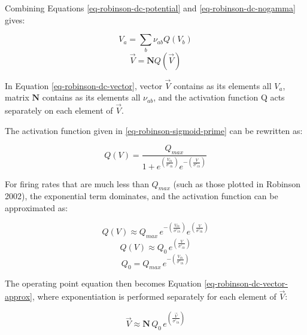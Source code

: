 Combining Equations \ref{eq-robinson-dc-potential} and
\ref{eq-robinson-dc-nogamma} gives:

\begin{equation}
V_a = \sum_b \nu_{ab} Q(V_b)
\label{eq-robinson-dc-scalar}
\end{equation}
%
\begin{equation}
\vec{V} = \mathbf{N} Q(\vec{V})
\label{eq-robinson-dc-vector}
\end{equation}

In Equation \ref{eq-robinson-dc-vector}, vector $\vec{V}$ contains as its
elements all $V_a$, matrix $\mathbf{N}$ contains as its elements all
$\nu_{ab}$, and the activation function Q acts separately on each element
of $\vec{V}$.

The activation function given in \ref{eq-robinson-sigmoid-prime} can be
rewritten as:

\begin{equation}
Q(V) = \frac{Q_{max}}{1 +
e^{\left ( \frac{V_{th}}{\sigma'_{th}} \right )}
e^{- \left ( \frac{V}{\sigma'_{th}} \right )}
}
\label{eq-robinson-sigmoid-shuffle-1}
\end{equation}

For firing rates that are much less than $Q_{max}$ (such as those plotted
in Robinson 2002), the exponential term dominates, and the activation
function can be approximated as:

\begin{equation}
Q(V) \approx Q_{max} \, e^{- \left ( \frac{V_{th}}{\sigma'_{th}} \right )}
e^{\left ( \frac{V}{\sigma'_{th}} \right )}
\label{eq-robinson-sigmoid-approx-full}
\end{equation}
%
\begin{equation}
Q(V) \approx Q_0 \, e^{\left ( \frac{V}{\sigma'_{th}} \right )}
\label{eq-robinson-sigmoid-approx}
\end{equation}
%
\begin{equation}
Q_0 = Q_{max} \, e^{- \left ( \frac{V_{th}}{\sigma'_{th}} \right )}
\label{eq-robinson-sigmoid-q0}
\end{equation}

The operating point equation then becomes Equation
\ref{eq-robinson-dc-vector-approx}, where exponentiation is performed
separately for each element of $\vec{V}$:

\begin{equation}
\vec{V} \approx
\mathbf{N} \, Q_0 \, e^{\left ( \frac{\vec{V}}{\sigma'_{th}} \right )}
\label{eq-robinson-dc-vector-approx}
\end{equation}


